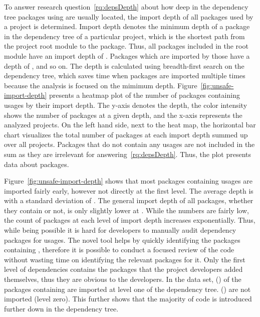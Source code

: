 To answer research question~\ref{rq:depsDepth} about how deep in the dependency tree packages using \unsafe{} are
usually located, the import depth of all packages used by a project is determined.
Import depth denotes the minimum depth of a package in the dependency tree of a particular project, which is the
shortest path from the project root module to the package.
Thus, all packages included in the root module have an import depth of .
Packages which are imported by those have a depth of , and so on.
The depth is calculated using breadth-first search on the dependency tree, which saves time when packages are imported
multiple times because the analysis is focused on the mimimum depth.
Figure~\ref{fig:unsafe-import-depth} presents a heatmap plot of the number of packages containing \unsafe{} usages by
their import depth.
The y-axis denotes the depth, the color intensity shows the number of \unsafe{} packages at a given depth, and the
x-axis represents the \projsAnalyzed{} analyzed projects.
On the left hand side, next to the heat map, the horizontal bar chart visualizes the total number of packages at each
import depth summed up over all projects.
Packages that do not contain any \unsafe{} usages are not included in the sum as they are irrelevant for
answering~\ref{rq:depsDepth}.
Thus, the plot presents data about \unsafePackages{} packages.



Figure~\ref{fig:unsafe-import-depth} shows that most packages containing \unsafe{} usages are imported fairly early,
however not directly at the first level.
The average depth is \averageUnsafeImportDepth{} with a standard deviation of \stdUnsafeImportDepth{}.
The general import depth of all packages, whether they contain \unsafe{} or not, is only slightly lower at
\averageGeneralImportDepth{}.
While the numbers are fairly low, the count of packages at each level of import depth increases exponentially.
Thus, while being possible it is hard for developers to manually audit dependency packages for \unsafe{} usages.
The novel \toolGeiger{} tool helps by quickly identifying the packages containing \unsafe{}, therefore it is possible to
conduct a focused review of the \unsafe{} code without wasting time on identifying the relevant packages for it.
Only the first level of dependencies contains the packages that the project developers added themselves, thus they are
obvious to the developers.
In the data set, \levelOneImportedUnsafePackagesCount{} (\levelOneImportedUnsafePackagesShare{}) of the
\unsafePackages{} packages containing \unsafe{} are imported at level one of the dependency tree.
\levelZeroImportedUnsafePackagesCount{} (\levelZeroImportedUnsafePackagesShare{}) are not imported (level zero).
This further shows that the majority of \unsafe{} code is introduced further down in the dependency tree.

